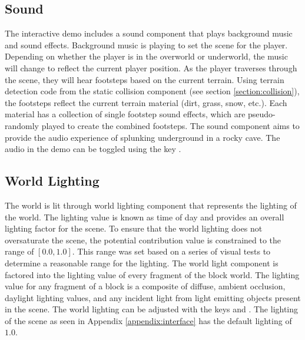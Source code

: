 \documentclass[a4paper,11pt,titlepage]{scrartcl}
\begin{document}
\subsection{Sound}
\label{section:sound}
The interactive demo includes a sound component that plays background music and sound effects. Background music is playing to set the scene for the player. Depending on whether the player is in the overworld or underworld, the music will change to reflect the current player position. As the player traverses through the scene, they will hear footsteps based on the current terrain. Using terrain detection code from the static collision component (see section \ref{section:collision}), the footsteps reflect the current terrain material (dirt, grass, snow, etc.). Each material has a collection of single footstep sound effects, which are pseudo-randomly played to create the combined footsteps. The sound component aims to provide the audio experience of splunking underground in a rocky cave.
\vskip 2.5mm\noindent
The audio in the demo can be toggled using the key .
    
\subsection{World Lighting}
\label{section:lighting}
The world is lit through world lighting component that represents the lighting of the world. The lighting value is known as time of day and provides an overall lighting factor for the scene. To ensure that the world lighting does not oversaturate the scene, the potential contribution value is constrained to the range of $[0.0, 1.0]$. This range was set based on a series of visual tests to determine a reasonable range for the lighting. The world light component is factored into the lighting value of every fragment of the block world. The lighting value for any fragment of a block is a composite of diffuse, ambient occlusion, daylight lighting values, and any incident light from light emitting objects present in the scene. 
\vskip 2.5mm\noindent
The world lighting can be adjusted with the keys  and . The lighting of the scene as seen in Appendix \ref{appendix:interface} has the default lighting of $1.0$.
    
\end{document}
